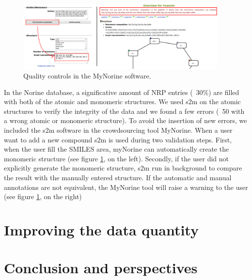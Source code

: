 \documentclass[long, final]{jobim2017}
\begin{document}
 \begin{figure}
   \begin{center}
     \includegraphics[width=400px]{figs/warnings.png}
   \end{center}
   \caption{Quality controls in the MyNorine software.}
   \label{fig:warnings}
 \end{figure}

In the Norine database, a significative amount of NRP entries (~30\%) are filled with both of the atomic and monomeric structures.
We used s2m on the atomic structures to verify the integrity of the data and we found a few errors (~50 with a wrong atomic or monomeric structure).
To avoid the insertion of new errors, we included the s2m software in the crowdsourcing tool MyNorine.
When a user want to add a new compound s2m is used during two validation steps.
First, when the user fill the SMILES area, myNorine can automatically create the monomeric structure (see figure \ref{fig:warnings}, on the left).
Secondly, if the user did not explicitly generate the monomeric structure, s2m run in background to compare the result with the manually entered structure.
If the automatic and manual annotations are not equivalent, the MyNorine tool will raise a warning to the user (see figure \ref{fig:warnings}, on the right)

\section{Improving the data quantity}

\section{Conclusion and perspectives}



 
 
\end{document}
